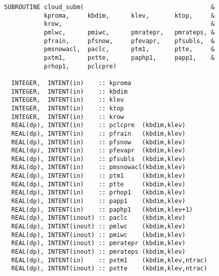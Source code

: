 \begin{lstlisting}[caption=cloud\_subm]
SUBROUTINE cloud_subm(                                   &
           kproma,     kbdim,      klev,       ktop,     &
           krow,                                         &
           pmlwc,      pmiwc,      pmratepr,   pmrateps, &
           pfrain,     pfsnow,     pfevapr,    pfsubls,  &
           pmsnowacl,  paclc,      ptm1,       ptte,     &
           pxtm1,      pxtte,      paphp1,     papp1,    &
           prhop1,     pclcpre)

  INTEGER,  INTENT(in)    :: kproma                      
  INTEGER,  INTENT(in)    :: kbdim                       
  INTEGER,  INTENT(in)    :: klev                        
  INTEGER,  INTENT(in)    :: ktop                        
  INTEGER,  INTENT(in)    :: krow                        
  REAL(dp), INTENT(in)    :: pclcpre  (kbdim,klev)       
  REAL(dp), INTENT(in)    :: pfrain   (kbdim,klev)       
  REAL(dp), INTENT(in)    :: pfsnow   (kbdim,klev)       
  REAL(dp), INTENT(in)    :: pfevapr  (kbdim,klev)       
  REAL(dp), INTENT(in)    :: pfsubls  (kbdim,klev)       
  REAL(dp), INTENT(in)    :: pmsnowacl(kbdim,klev)       
  REAL(dp), INTENT(in)    :: ptm1     (kbdim,klev)       
  REAL(dp), INTENT(in)    :: ptte     (kbdim,klev)       
  REAL(dp), INTENT(in)    :: prhop1   (kbdim,klev)       
  REAL(dp), INTENT(in)    :: papp1    (kbdim,klev)       
  REAL(dp), INTENT(in)    :: paphp1   (kbdim,klev+1)     
  REAL(dp), INTENT(inout) :: paclc    (kbdim,klev)       
  REAL(dp), INTENT(inout) :: pmlwc    (kbdim,klev)       
  REAL(dp), INTENT(inout) :: pmiwc    (kbdim,klev)       
  REAL(dp), INTENT(inout) :: pmratepr (kbdim,klev)       
  REAL(dp), INTENT(inout) :: pmrateps (kbdim,klev)       
  REAL(dp), INTENT(in)    :: pxtm1    (kbdim,klev,ntrac) 
  REAL(dp), INTENT(inout) :: pxtte    (kbdim,klev,ntrac) 
\end{lstlisting}

